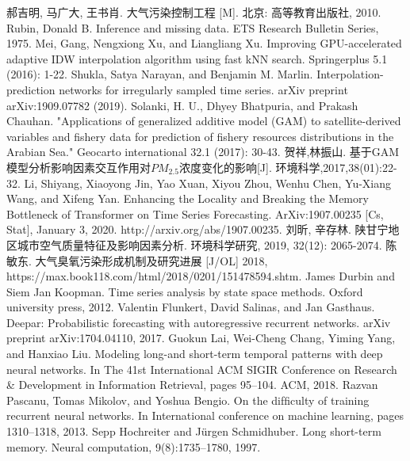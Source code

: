 \documentclass[a4paper,10pt]{my_paper}
\numberwithin{equation}{section}
\begin{document}
\begin{thebibliography}{10}
郝吉明, 马广大, 王书肖. 大气污染控制工程 [M]. 北京: 高等教育出版社, 2010.
Rubin, Donald B. Inference and missing data. ETS Research Bulletin Series, 1975.
Mei, Gang, Nengxiong Xu, and Liangliang Xu. Improving GPU-accelerated adaptive IDW interpolation algorithm using fast kNN search. Springerplus 5.1 (2016): 1-22.
Shukla, Satya Narayan, and Benjamin M. Marlin. Interpolation-prediction networks for irregularly sampled time series. arXiv preprint arXiv:1909.07782 (2019).
Solanki, H. U., Dhyey Bhatpuria, and Prakash Chauhan. "Applications of generalized additive model (GAM) to satellite-derived variables and fishery data for prediction of fishery resources distributions in the Arabian Sea." Geocarto international 32.1 (2017): 30-43.
贺祥,林振山. 基于GAM模型分析影响因素交互作用对${PM_{2.5}}$浓度变化的影响[J]. 环境科学,2017,38(01):22-32.
Li, Shiyang, Xiaoyong Jin, Yao Xuan, Xiyou Zhou, Wenhu Chen, Yu-Xiang Wang, and Xifeng Yan. Enhancing the Locality and Breaking the Memory Bottleneck of Transformer on Time Series Forecasting. ArXiv:1907.00235 [Cs, Stat], January 3, 2020. http://arxiv.org/abs/1907.00235.
刘昕, 辛存林. 陕甘宁地区城市空气质量特征及影响因素分析. 环境科学研究, 2019, 32(12): 2065-2074.
陈敏东. 大气臭氧污染形成机制及研究进展 [J/OL] 2018, https://max.book118.com/html/2018/0201/151478594.shtm.
James  Durbin  and  Siem  Jan  Koopman.   Time  series  analysis  by  state  space  methods.   Oxford  university press,  2012.
Valentin  Flunkert,  David  Salinas,  and  Jan  Gasthaus.  Deepar:  Probabilistic  forecasting  with  autoregressive recurrent networks.  arXiv preprint arXiv:1704.04110, 2017.
Guokun Lai, Wei-Cheng Chang, Yiming Yang, and Hanxiao Liu. Modeling long-and short-term temporal patterns with deep neural networks. In The 41st International ACM SIGIR Conference on Research \& Development in Information Retrieval, pages 95–104. ACM, 2018.
Razvan  Pascanu,  Tomas  Mikolov,  and  Yoshua  Bengio.     On  the  difﬁculty  of  training  recurrent  neural networks.  In International conference  on machine learning, pages 1310–1318,  2013.
Sepp Hochreiter and Jürgen Schmidhuber.  Long short-term memory.  Neural computation, 9(8):1735–1780, 1997.

\end{thebibliography}
\end{document}
